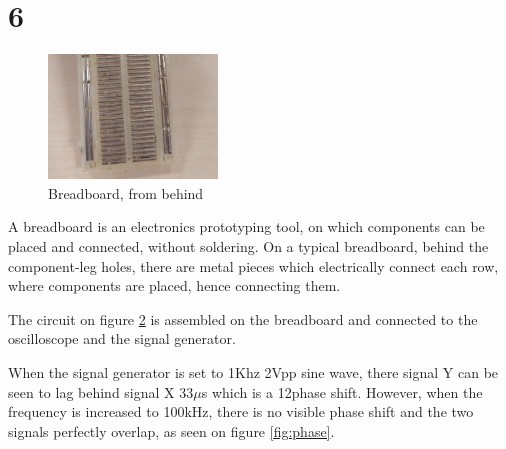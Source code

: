 \documentclass[a4paper, 12pt]{article}
\begin{document}
\section{6}

\begin{figure}
	\centering
	\includegraphics[width=0.4\textwidth]{6.0.jpg}
	\caption{Breadboard, from behind}
	\label{fig:breadboard}
\end{figure}

A breadboard is an electronics prototyping tool, on which components can be placed and connected, without soldering.
On a typical breadboard, behind the component-leg holes, there are metal pieces which electrically connect each row, where components are placed, hence connecting them.

\begin{figure}[!h]
	\centering
	\hfill
	\caption{}
	\label{fig:circuit}
\end{figure}

The circuit on figure \ref{fig:circuit} is assembled on the breadboard and connected to the oscilloscope and the signal generator.


When the signal generator is set to 1Khz 2Vpp sine wave, there signal Y can be seen to lag behind signal X 33$\mu$s which is a 12\degree phase shift.
However, when the frequency is increased to 100kHz, there is no visible phase shift and the two signals perfectly overlap, as seen on figure \ref{fig:phase}.
\end{document}
